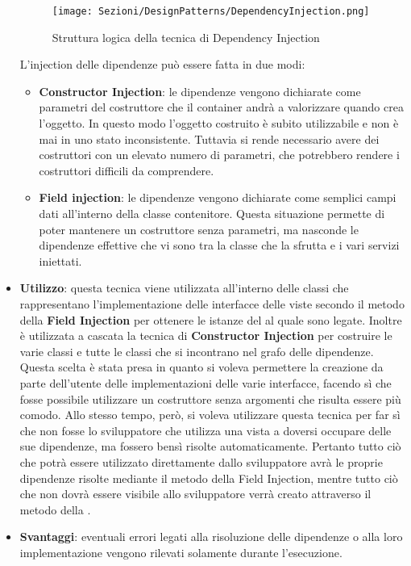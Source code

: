 \begin{itemize}
	\begin{figure}[ht]
	\centering
	\texttt{[image: Sezioni/DesignPatterns/DependencyInjection.png]}
	\caption{Struttura logica della tecnica di Dependency Injection}
	\end{figure}
	L'injection delle dipendenze può essere fatta in due modi:
	\begin{itemize}
	 	\item \textbf{Constructor Injection}: le dipendenze vengono dichiarate come parametri del costruttore
che il container andrà a valorizzare quando crea l’oggetto. In questo modo l’oggetto costruito è subito utilizzabile e non è mai in uno stato inconsistente. Tuttavia
si rende necessario avere dei costruttori con un elevato numero di parametri, che
potrebbero rendere i costruttori difficili da comprendere.
 	 	\item \textbf{Field injection}: le dipendenze vengono dichiarate come semplici campi dati all'interno della classe contenitore. Questa situazione permette di poter mantenere un costruttore senza parametri, ma nasconde le dipendenze effettive che vi sono tra la classe che la sfrutta e i vari servizi iniettati.
	\end{itemize}
	
	\item \textbf{Utilizzo}: questa tecnica viene utilizzata all'interno delle classi che rappresentano l'implementazione delle interfacce delle viste secondo il metodo della \textbf{Field Injection} per ottenere le istanze del  al quale sono legate. Inoltre è utilizzata a cascata la tecnica di \textbf{Constructor Injection} per costruire le varie classi  e tutte le classi che si incontrano nel grafo delle dipendenze.
	Questa scelta è stata presa in quanto si voleva permettere la creazione da parte dell'utente delle implementazioni delle varie interfacce, facendo sì che fosse possibile utilizzare un costruttore senza argomenti che risulta essere più comodo. Allo stesso tempo, però, si voleva utilizzare questa tecnica per far sì che non fosse lo sviluppatore che utilizza una vista a doversi occupare delle sue dipendenze, ma fossero bensì risolte automaticamente. Pertanto tutto ciò che potrà essere utilizzato direttamente dallo sviluppatore avrà le proprie dipendenze risolte mediante il metodo della Field Injection, mentre tutto ciò che non dovrà essere visibile allo sviluppatore verrà creato attraverso il metodo della .
	\item \textbf{Svantaggi}: eventuali errori legati alla risoluzione delle dipendenze o alla loro
implementazione vengono rilevati solamente durante l'esecuzione.
\end{itemize}